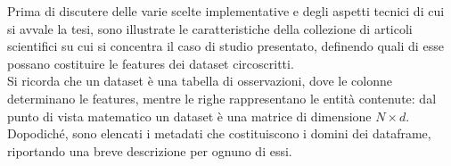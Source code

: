 Prima di discutere delle varie scelte implementative e degli aspetti tecnici di cui si avvale la tesi, sono illustrate le caratteristiche della collezione di articoli scientifici su cui si concentra il caso di studio presentato, definendo quali di esse possano costituire le features dei dataset circoscritti. \vspace{7pt} \\
Si ricorda che un dataset è una tabella di osservazioni, dove le colonne determinano le features, mentre le righe rappresentano le entità contenute: dal punto di vista matematico un dataset è una matrice di dimensione $N \times d$. \vspace{7pt} \\
Dopodiché, sono elencati i metadati che costituiscono i domini dei dataframe, riportando una breve descrizione per ognuno di essi.